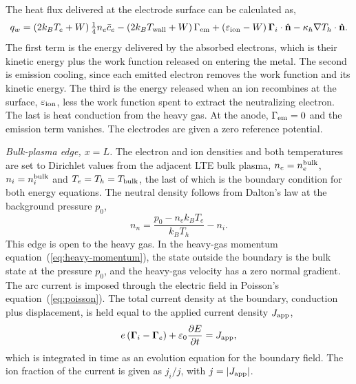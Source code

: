 The heat flux delivered at the electrode surface can be calculated as,
\begin{equation}
q_w=\left(2k_BT_e+W\right)\tfrac14n_e\bar c_e
-\left(2k_BT_{\rm wall}+W\right)\Gamma_{\rm em}
+\left(\varepsilon_{\rm ion}-W\right)\boldsymbol{\Gamma}_i\cdot\hat{\mathbf{n}}
-\kappa_h\nabla T_h\cdot\hat{\mathbf{n}} .
\label{eq:bc-qwall}
\end{equation}
The first term is the energy delivered by the absorbed electrons, which is their kinetic energy plus the work function released on entering the metal. The second is emission cooling, since each emitted electron removes the work function and its kinetic energy. The third is the energy released when an ion recombines at the surface, \(\varepsilon_{\rm ion}\), less the work function spent to extract the neutralizing electron. The last is heat conduction from the heavy gas. At the anode, \(\Gamma_{\rm em}=0\) and the emission term vanishes. The electrodes are given a zero reference potential.

\emph{Bulk-plasma edge, \(x=L\).} The electron and ion densities and both temperatures are set to Dirichlet values from the adjacent LTE bulk plasma, \(n_e=n_e^{\rm bulk}\), \(n_i=n_i^{\rm bulk}\) and \(T_e=T_h=T_{\rm bulk}\), the last of which is the boundary condition for both energy equations. The neutral density follows from Dalton's law at the background pressure \(p_0\),
\begin{equation}
n_n=\frac{p_0-n_ek_BT_e}{k_BT_h}-n_i .
\label{eq:bc-neutral-density}
\end{equation}
This edge is open to the heavy gas. In the heavy-gas momentum equation~(\ref{eq:heavy-momentum}), the state outside the boundary is the bulk state at the pressure \(p_0\), and the heavy-gas velocity has a zero normal gradient. The arc current is imposed through the electric field in Poisson's equation~(\ref{eq:poisson}). The total current density at the boundary, conduction plus displacement, is held equal to the applied current density \(J_{\rm app}\),
\begin{equation}
e\left(\boldsymbol{\Gamma}_i-\boldsymbol{\Gamma}_e\right)+\varepsilon_0\frac{\partial E}{\partial t}=J_{\rm app},
\label{eq:bc-current}
\end{equation}
which is integrated in time as an evolution equation for the boundary field. The ion fraction of the current is given as \(j_i/j\), with \(j=|J_{\rm app}|\). 